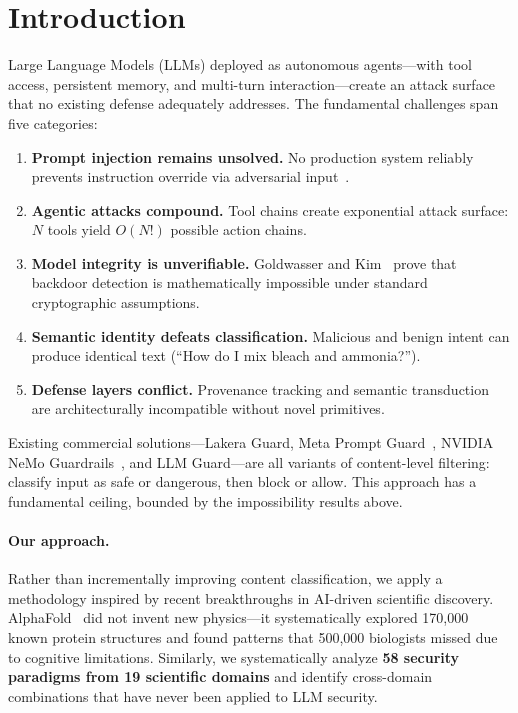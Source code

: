 \section{Introduction}
\label{sec:introduction}

Large Language Models (LLMs) deployed as autonomous agents---with tool access, persistent memory, and multi-turn interaction---create an attack surface that no existing defense adequately addresses. The fundamental challenges span five categories:

\begin{enumerate}[leftmargin=*]
\item \textbf{Prompt injection remains unsolved.} No production system reliably prevents instruction override via adversarial input~\cite{greshake2023}.
\item \textbf{Agentic attacks compound.} Tool chains create exponential attack surface: $N$ tools yield $O(N!)$ possible action chains.
\item \textbf{Model integrity is unverifiable.} Goldwasser and Kim~\cite{goldwasser2022} prove that backdoor detection is mathematically impossible under standard cryptographic assumptions.
\item \textbf{Semantic identity defeats classification.} Malicious and benign intent can produce identical text (``How do I mix bleach and ammonia?'').
\item \textbf{Defense layers conflict.} Provenance tracking and semantic transduction are architecturally incompatible without novel primitives.
\end{enumerate}

Existing commercial solutions---Lakera Guard, Meta Prompt Guard~\cite{promptguard2024}, NVIDIA NeMo Guardrails~\cite{nemo2023}, and LLM Guard---are all variants of content-level filtering: classify input as safe or dangerous, then block or allow. This approach has a fundamental ceiling, bounded by the impossibility results above.

\paragraph{Our approach.} Rather than incrementally improving content classification, we apply a methodology inspired by recent breakthroughs in AI-driven scientific discovery. AlphaFold~\cite{alphafold2021} did not invent new physics---it systematically explored 170,000 known protein structures and found patterns that 500,000 biologists missed due to cognitive limitations. Similarly, we systematically analyze \textbf{58 security paradigms from 19 scientific domains} and identify cross-domain combinations that have never been applied to LLM security.


